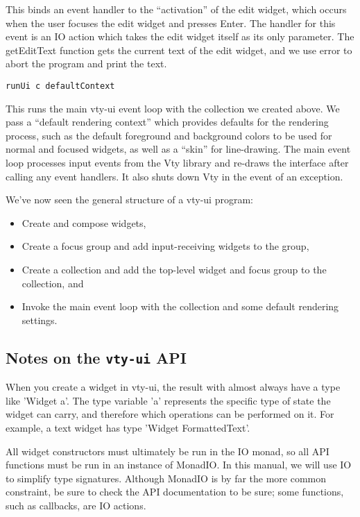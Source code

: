 This binds an event handler to the “activation” of the edit widget,
which occurs when the user focuses the edit widget and presses Enter.
The handler for this event is an IO action which takes the edit widget
itself as its only parameter.  The getEditText function gets the current
text of the edit widget, and we use error to abort the program and print
the text.

\begin{verbatim}
runUi c defaultContext
\end{verbatim}

This runs the main vty-ui event loop with the collection we created
above.  We pass a “default rendering context” which provides defaults
for the rendering process, such as the default foreground and background
colors to be used for normal and focused widgets, as well as a “skin”
for line-drawing.  The main event loop processes input events from the
Vty library and re-draws the interface after calling any event handlers.
It also shuts down Vty in the event of an exception.

We've now seen the general structure of a vty-ui program:
\begin{itemize}
\item Create and compose widgets,
\item Create a focus group and add input-receiving widgets to the group,
\item Create a collection and add the top-level widget and focus group
      to the collection, and
\item Invoke the main event loop with the collection and some default
      rendering settings.
\end{itemize}

\subsection{Notes on the \texttt{vty-ui} API}

When you create a widget in vty-ui, the result with almost always have a
type like 'Widget a'.  The type variable 'a' represents the specific
type of state the widget can carry, and therefore which operations can
be performed on it.  For example, a text widget has type 'Widget
FormattedText'.

All widget constructors must ultimately be run in the IO monad, so all
API functions must be run in an instance of MonadIO.  In this manual, we
will use IO to simplify type signatures.  Although MonadIO is by far the
more common constraint, be sure to check the API documentation to be
sure; some functions, such as callbacks, are IO actions.
